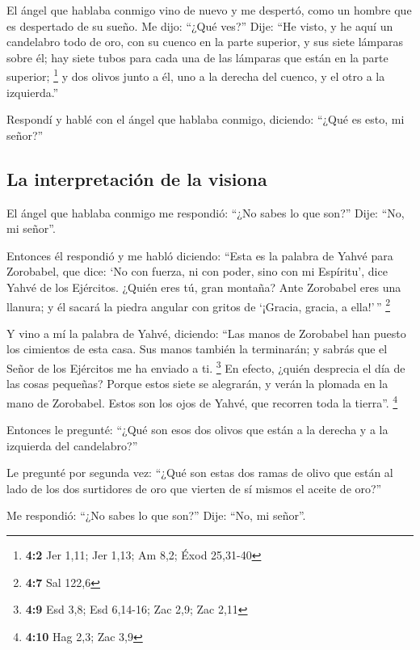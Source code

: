 \begin{paracol}{2}
 El ángel que hablaba conmigo vino de nuevo y me despertó,
como un hombre que es despertado de su sueño.  Me dijo:
``¿Qué ves?'' Dije: ``He visto, y he aquí un candelabro todo de oro, con
su cuenco en la parte superior, y sus siete lámparas sobre él; hay siete
tubos para cada una de las lámparas que están en la parte superior;
\footnote{\textbf{4:2} Jer 1,11; Jer 1,13; Am 8,2; Éxod 25,31-40}
 y dos olivos junto a él, uno a la derecha del cuenco, y
el otro a la izquierda.''

 Respondí y hablé con el ángel que hablaba conmigo,
diciendo: ``¿Qué es esto, mi señor?''

\hypertarget{la-interpretaciuxf3n-de-la-visiona}{%
\subsection{La interpretación de la
visiona}\label{la-interpretaciuxf3n-de-la-visiona}}

 El ángel que hablaba conmigo me respondió: ``¿No sabes lo
que son?'' Dije: ``No, mi señor''.

 Entonces él respondió y me habló diciendo: ``Esta es la
palabra de Yahvé para Zorobabel, que dice: `No con fuerza, ni con poder,
sino con mi Espíritu', dice Yahvé de los Ejércitos. 
¿Quién eres tú, gran montaña? Ante Zorobabel eres una llanura; y él
sacará la piedra angular con gritos de `¡Gracia, gracia, a ella!'\,''
\footnote{\textbf{4:7} Sal 122,6}

 Y vino a mí la palabra de Yahvé, diciendo: 
``Las manos de Zorobabel han puesto los cimientos de esta casa. Sus
manos también la terminarán; y sabrás que el Señor de los Ejércitos me
ha enviado a ti. \footnote{\textbf{4:9} Esd 3,8; Esd 6,14-16; Zac 2,9;
  Zac 2,11}  En efecto, ¿quién desprecia el día de las
cosas pequeñas? Porque estos siete se alegrarán, y verán la plomada en
la mano de Zorobabel. Estos son los ojos de Yahvé, que recorren toda la
tierra''. \footnote{\textbf{4:10} Hag 2,3; Zac 3,9}

 Entonces le pregunté: ``¿Qué son esos dos olivos que
están a la derecha y a la izquierda del candelabro?''

 Le pregunté por segunda vez: ``¿Qué son estas dos ramas
de olivo que están al lado de los dos surtidores de oro que vierten de
sí mismos el aceite de oro?''

 Me respondió: ``¿No sabes lo que son?'' Dije: ``No, mi
señor''.


\end{paracol}
